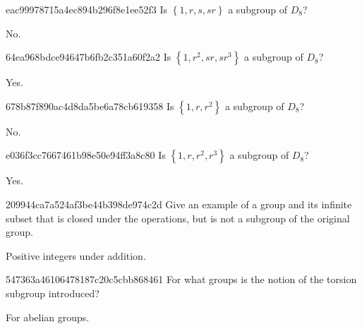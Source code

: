 \begin{note}{eac99978715a4ec894b296f8e1ee52f3}
    Is \({ \left\{ 1, r, s, sr \right\} }\) a subgroup of \({ D_8 }\)?

    \begin{cloze}{1}
        No.
    \end{cloze}
\end{note}

\begin{note}{64ea968bdce94647b6fb2c351a60f2a2}
    Is \({ \left\{ 1, r^2, sr, sr^3 \right\} }\) a subgroup of \({ D_8 }\)?

    \begin{cloze}{1}
        Yes.
    \end{cloze}
\end{note}

\begin{note}{678b87f890ac4d8da5be6a78cb619358}
    Is \({ \left\{ 1, r, r^2 \right\} }\) a subgroup of \({ D_8 }\)?

    \begin{cloze}{1}
        No.
    \end{cloze}
\end{note}

\begin{note}{e036f3cc7667461b98e50e94ff3a8c80}
    Is \({ \left\{ 1, r, r^2, r^3 \right\} }\) a subgroup of \({ D_8 }\)?

    \begin{cloze}{1}
        Yes.
    \end{cloze}
\end{note}

\begin{note}{209944ca7a524af3be44b398de974c2d}
    Give an example of a group and its infinite subset that is closed under the operations, but is not a subgroup of the original group.

    \begin{cloze}{1}
        Positive integers under addition.
    \end{cloze}
\end{note}

\begin{note}{547363a46106478187c20c5cbb868461}
    For what groups is the notion of the torsion subgroup introduced?

    \begin{cloze}{1}
        For abelian groups.
    \end{cloze}
\end{note}

